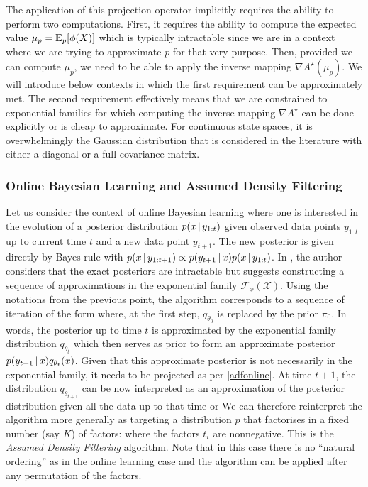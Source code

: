 The application of this projection operator implicitly requires the ability to perform two computations. First, it requires the ability to compute the expected value $\mu_p=\mathbb E_{p}[\phi(X)]$ which is typically intractable since we are in a context where we are trying to approximate $p$ for that very purpose. Then, provided we can compute $\mu_p$, we need to be able to apply the inverse mapping $\nabla A^{\star}(\mu_p)$. We will introduce below contexts in which the first requirement can be approximately met. The second requirement effectively means that we are constrained to exponential families for which computing the inverse mapping $\nabla A^{\star}$ can be done explicitly or is cheap to approximate. For continuous state spaces, it is overwhelmingly the Gaussian distribution that is considered in the literature with either a diagonal or a full covariance matrix. 
%
\subsubsection*{Online Bayesian Learning and Assumed Density Filtering}
%
Let us consider the context of online Bayesian learning where one is interested in the evolution of a posterior distribution $p(x\,|\, y_{1:t})$ given observed \iid data points $y_{1:t}$ up to current time $t$ and a new \iid data point $y_{t+1}$. 
The new posterior is given directly by Bayes rule with $p(x\,|\, y_{1:t+1})\propto p(y_{t+1}\,|\, x) p(x\,|\, y_{1:t})$. 
In \citet{opper98}, the author considers that the exact posteriors are intractable but suggests constructing a sequence of approximations in the exponential family $\mathcal F_{\phi}(\mathcal X)$. 
Using the notations from the previous point, the algorithm corresponds to a sequence of iteration of the form
%
%
where, at the first step, $q_{\theta_{0}}$ is replaced by the prior $\pi_{0}$. In words, the posterior up to time $t$ is approximated by the exponential family distribution $q_{\theta_{t}}$ which then serves as prior to form an approximate posterior $p(y_{t+1}\,|\, x)q_{\theta_{t}}(x)$. 
Given that this approximate posterior is not necessarily in the exponential family, it needs to be projected as per \eqref{adfonline}. 
At time $t+1$, the distribution $q_{\theta_{t+1}}$ can be now interpreted as an approximation of the posterior distribution given all the data up to that time or 
%
%
We can therefore reinterpret the algorithm more generally as targeting a distribution $p$ that factorises in a fixed number (say $K$) of factors: 
%
%
where the factors $t_i$ are nonnegative. This is the \emph{Assumed Density Filtering} algorithm. Note that in this case there is no ``natural ordering'' as in the online learning case and the algorithm can be applied after any permutation of the factors.


